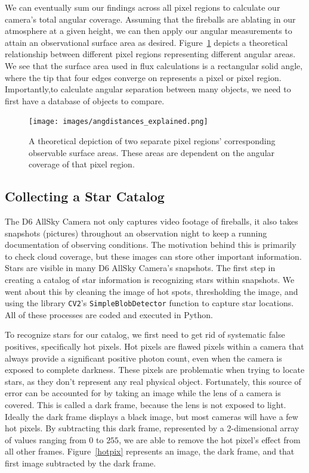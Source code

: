 We can eventually sum our findings across all pixel regions to calculate our camera's total angular coverage.  
Assuming that the fireballs are ablating in our atmosphere at a given height, we can then apply our angular measurements to attain an observational surface area as desired.
Figure~\ref{angdist_exp} depicts a theoretical relationship between different pixel regions representing different angular areas.
We see that the surface area used in flux calculations is a rectangular solid angle, where the tip that four edges converge on represents a pixel or pixel region.
Importantly,to calculate angular separation between many objects, we need to first have a database of objects to compare.

\begin{figure}[ht!]
  \centering
  \texttt{[image: images/angdistances\_explained.png]}
  \caption{A theoretical depiction of two separate pixel regions' corresponding observable surface areas.  These areas are dependent on the angular coverage of that pixel region.}
  \label{angdist_exp}
\end{figure}

\subsection{Collecting a Star Catalog}

The D6 AllSky Camera not only captures video footage of fireballs, it also takes snapshots (pictures) throughout an observation night to keep a running documentation of observing conditions.
The motivation behind this is primarily to check cloud coverage, but these images can store other important information.
Stars are visible in many D6 AllSky Camera's snapshots.  
The first step in creating a catalog of star information is recognizing stars within snapshots.  
We went about this by cleaning the image of hot spots, thresholding the image, and using the library \texttt{CV2}'s \texttt{SimpleBlobDetector} function to capture star locations.
All of these processes are coded and executed in Python.

To recognize stars for our catalog, we first need to get rid of systematic false positives, specifically hot pixels.
Hot pixels are flawed pixels within a camera that always provide a significant positive photon count, even when the camera is exposed to complete darkness.
These pixels are problematic when trying to locate stars, as they don't represent any real physical object.
Fortunately, this source of error can be accounted for by taking an image while the lens of a camera is covered.  
This is called a dark frame, because the lens is not exposed to light.
Ideally the dark frame displays a black image, but most cameras will have a few hot pixels.
By subtracting this dark frame, represented by a 2-dimensional array of values ranging from $0$ to $255$, we are able to remove the hot pixel's effect from all other frames.
Figure~\ref{hotpix} represents an image, the dark frame, and that first image subtracted by the dark frame.



